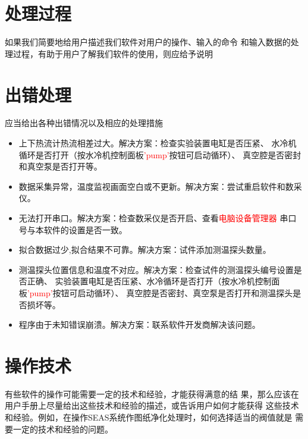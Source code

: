 \section{处理过程}
如果我们简要地给用户描述我们软件对用户的操作、输入的命令
和输入数据的处理过程，有助于用户了解我们软件的使用，则应给予说明
\section{出错处理}
应当给出各种出错情况以及相应的处理措施
\begin{itemize}
    \item 上下热流计热流相差过大。解决方案：检查实验装置电缸是否压紧、
    水冷机循环是否打开（按水冷机控制面板\textcolor{red}{'pump'}按钮可启动循环）、
    真空腔是否密封和真空泵是否打开等。
    \item 数据采集异常，温度监视画面空白或不更新。解决方案：尝试重启软件和数采仪。
    \item 无法打开串口。解决方案：检查数采仪是否开启、查看\textcolor{red}{电脑设备管理器}
    串口号与本软件的设置是否一致。
    \item 拟合数据过少,拟合结果不可靠。解决方案：试件添加测温探头数量。
    \item 测温探头位置信息和温度不对应。解决方案：检查试件的测温探头编号设置是否正确、
    实验装置电缸是否压紧、水冷循环是否打开（按水冷机控制面板\textcolor{red}{'pump'}按钮可启动循环）、
    真空腔是否密封、真空泵是否打开和测温探头是否损坏等。
    \item 程序由于未知错误崩溃。解决方案：联系软件开发商解决该问题。

\end{itemize}

\section{操作技术}
有些软件的操作可能需要一定的技术和经验，才能获得满意的结
果，那么应该在用户手册上尽量给出这些技术和经验的描述，或告诉用户如何才能获得
这些技术和经验。例如，在操作SEAS系统作图纸净化处理时，如何选择适当的阀值就是
需要一定的技术和经验的问题。